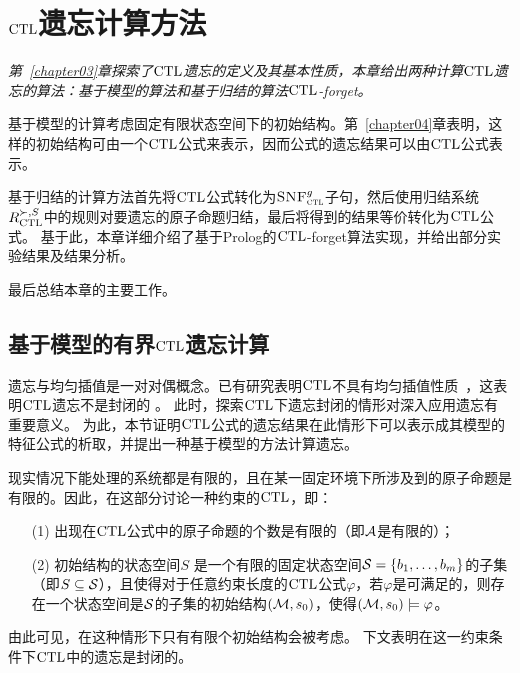 
\chapter{$\textrm{CTL}$遗忘计算方法}
\label{chapter05}
{\em 第~\ref{chapter03}章探索了$\textrm{CTL}$遗忘的定义及其基本性质，本章给出两种计算$\textrm{CTL}$遗忘的算法：基于模型的算法和基于归结的算法$\textrm{CTL}$-forget。
	
	基于模型的计算考虑固定有限状态空间下的初始结构。第~\ref{chapter04}章表明，这样的初始结构可由一个$\textrm{CTL}$公式来表示，因而公式的遗忘结果可以由$\textrm{CTL}$公式表示。

基于归结的计算方法首先将$\textrm{CTL}$公式转化为${\textsc{SNF}_{\textsc{ctl}}^g}$子句，然后使用归结系统$R_{\textrm{CTL}}^{\succ,S}$中的规则对要遗忘的原子命题归结，最后将得到的结果等价转化为$\textrm{CTL}$公式。
基于此，本章详细介绍了基于Prolog的$\textrm{CTL}$-forget算法实现，并给出部分实验结果及结果分析。

最后总结本章的主要工作。}

\section{基于模型的有界$\textrm{CTL}$遗忘计算}
\label{chapter05:sec:model}
	遗忘与均匀插值是一对对偶概念。已有研究表明$\textrm{CTL}$不具有均匀插值性质~\cite{Maksimova:JANCL:1991}，这表明$\textrm{CTL}$遗忘不是封闭的
	。
	此时，探索$\textrm{CTL}$下遗忘封闭的情形对深入应用遗忘有重要意义。
	为此，本节证明$\textrm{CTL}$公式的遗忘结果在此情形下可以表示成其模型的特征公式的析取，并提出一种基于模型的方法计算遗忘。%





现实情况下能处理的系统都是有限的，且在某一固定环境下所涉及到的原子命题是有限的。因此，在这部分讨论一种约束的$\textrm{CTL}$，即：
\begin{itemize}
	\item[(1)] 出现在$\textrm{CTL}$公式中的原子命题的个数是有限的（即${\cal A}$是有限的）；
	\item[(2)] 初始结构的状态空间$S$ 是一个有限的固定状态空间${\cal S}=\{b_1,\ldots,b_m\}$的子集（即$S \subseteq {\cal S}$），且使得对于任意约束长度的$\textrm{CTL}$公式$\varphi$，若$\varphi$是可满足的，则存在一个状态空间是${\cal S}$的子集的初始结构$({\cal M},s_0)$，使得$({\cal M},s_0)\models \varphi$。
\end{itemize}
由此可见，在这种情形下只有有限个初始结构会被考虑。
下文表明在这一约束条件下$\textrm{CTL}$中的遗忘是封闭的。

